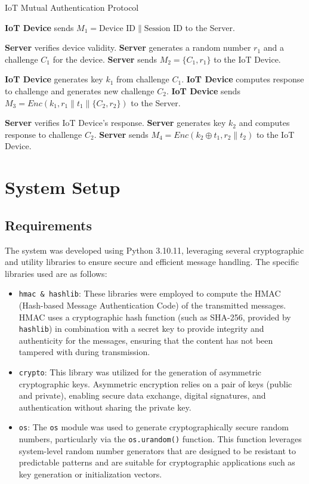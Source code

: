 \documentclass[10pt,twocolumn,letterpaper]{article}
\begin{document}
\begin{algorithm}
    \caption{IoT Mutual Authentication Protocol}
    \begin{algorithmic}[1]

        \State \textbf{IoT Device} sends $M_1 = \text{Device ID} \parallel \text{Session ID}$ to the Server.

        \State \textbf{Server} verifies device validity.
        \State \textbf{Server} generates a random number $r_1$ and a challenge $C_1$ for the device.
        \State \textbf{Server} sends $M_2 = \{C_1, r_1\}$ to the IoT Device.

        \State \textbf{IoT Device} generates key $k_1$ from challenge $C_1$.
        \State \textbf{IoT Device} computes response to challenge and generates new challenge $C_2$.
        \State \textbf{IoT Device} sends $M_3 = Enc(k_1, r_1 \parallel t_1 \parallel \{C_2,r_2\})$ to the Server.

        \State \textbf{Server} verifies IoT Device’s response.
        \State \textbf{Server} generates key $k_2$ and computes response to challenge $C_2$.
        \State \textbf{Server} sends $M_4 = Enc(k_2 \oplus t_1, r_2 \parallel t_2)$ to the IoT Device.
    \end{algorithmic}
\end{algorithm}

\section{System Setup}
\subsection{Requirements}
The system was developed using Python 3.10.11, leveraging several cryptographic and utility libraries to ensure secure and efficient message handling.
The specific libraries used are as follows:

\begin{itemize}
    \item \texttt{hmac \& hashlib}: These libraries were employed to compute the HMAC (Hash-based Message Authentication Code) of the transmitted messages.
          HMAC uses a cryptographic hash function (such as SHA-256, provided by \texttt{hashlib}) in combination with a secret key to provide integrity and authenticity for the messages,
          ensuring that the content has not been tampered with during transmission.
    \item \texttt{crypto}: This library was utilized for the generation of asymmetric cryptographic keys.
          Asymmetric encryption relies on a pair of keys (public and private), enabling secure data exchange, digital signatures, and authentication without sharing the private key.
    \item \texttt{os}: The \texttt{os} module was used to generate cryptographically secure random numbers, particularly via the \texttt{os.urandom()} function.
          This function leverages system-level random number generators that are designed to be resistant to predictable patterns and are suitable for cryptographic applications such as key generation or initialization vectors.
\end{itemize}
\end{document}
